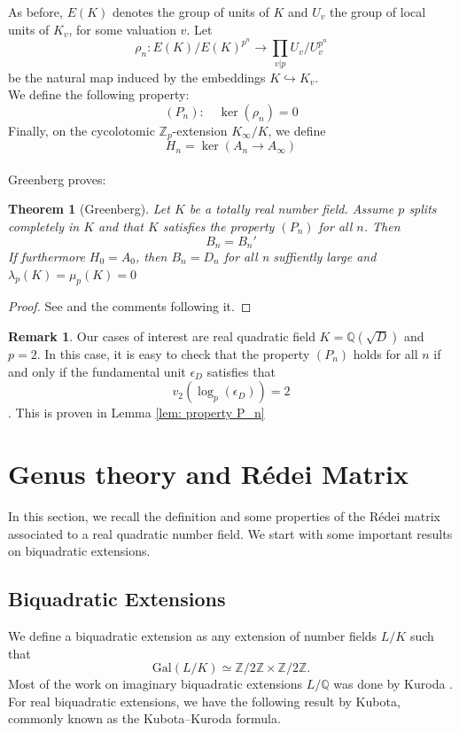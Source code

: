 \documentclass{article}
\numberwithin{equation}{section}
\theoremstyle{plain}  %
\newtheorem{theorem}{Theorem}[section]
\theoremstyle{definition}
\newtheorem{remark}{Remark}[section]
\newcommand{\Z}{\mathbb{Z}}
\newcommand{\Q}{\mathbb{Q}}
\newcommand{\Redei}{R\'edei }
\begin{document}
As before, $E(K)$ denotes the group of units of $K$ and $U_v$ the group of local units of $K_v$, for some valuation $v$. Let $$\rho_n:E(K)/E(K)^{p^n} \to \prod_{v|p} U_v/U_v^{p^n}$$ be the natural map induced by the embeddings $K \hookrightarrow K_v$.
\\
We define the following property: 
\begin{equation}
    \label{eq: property Pn}
    (P_n): \quad \ker(\rho_n)=0
\end{equation}
Finally, on the cycolotomic $\Z_p$-extension $K_\infty/K$, we define  $$H_n=\ker(A_n\to A_\infty)$$\\
Greenberg proves:

\begin{theorem}[Greenberg]\label{th: greenberg split Bn}
Let $K$ be a totally real number field. Assume $p$ splits completely in $K$ and that $K$ satisfies the property $(P_n)$ for all $n$. Then $$B_n=B_n'$$ If furthermore $H_0=A_0$, then $B_n=D_n$ for all n suffiently large and $\lambda_p(K)=\mu_p(K)=0$
    
\end{theorem}

\begin{proof}
    See \cite[Theorem~2]{MR401702} and the comments following it.
\end{proof}

\begin{remark}\label{rmk: property P_n}
    Our cases of interest are real quadratic field $K=\Q(\sqrt D)$ and $p=2$. In this case, it is easy to check that the property $(P_n)$ holds for all $n$ if and only if the fundamental unit $\epsilon_D$ satisfies that $$v_2(\log_p(\epsilon_D))=2$$. This is proven in Lemma \ref{lem: property P_n}
\end{remark}




\section{Genus theory and \Redei Matrix}
In this section, we recall the definition and some properties of the \Redei matrix associated to a real quadratic number field. We start with some important results on biquadratic extensions. 

\subsection{Biquadratic Extensions}

We define a biquadratic extension as any extension of number fields $L/K$ such that
$$
\mathrm{Gal}(L/K) \simeq \Z / 2 \Z \times \Z / 2 \Z.
$$
Most of the work on imaginary biquadratic extensions $L/\mathbb{Q}$ was done by
Kuroda \cite{MR21031}. For real biquadratic extensions, we have the following result
by Kubota, commonly known as the Kubota--Kuroda formula.
\end{document}
